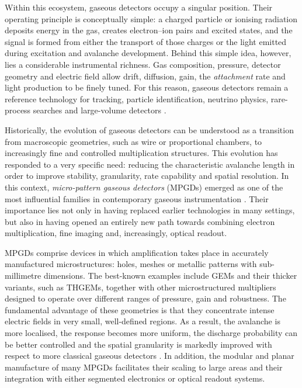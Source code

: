 \documentclass[12pt,a4paper]{article}
\begin{document}
Within this ecosystem, gaseous detectors occupy a singular position. Their operating principle is conceptually simple: a charged particle or ionising radiation deposits energy in the gas, creates electron--ion pairs and excited states, and the signal is formed from either the transport of those charges or the light emitted during excitation and avalanche development. Behind this simple idea, however, lies a considerable instrumental richness. Gas composition, pressure, detector geometry and electric field allow drift, diffusion, gain, the \textit{attachment} rate and light production to be finely tuned. For this reason, gaseous detectors remain a reference technology for tracking, particle identification, neutrino physics, rare-process searches and large-volume detectors \cite{gonzlezdaz2017gaseous,hayrapetyan2024dune,next2014present,esfahani2023project}.

Historically, the evolution of gaseous detectors can be understood as a transition from macroscopic geometries, such as wire or proportional chambers, to increasingly fine and controlled multiplication structures. This evolution has responded to a very specific need: reducing the characteristic avalanche length in order to improve stability, granularity, rate capability and spatial resolution. In this context, \emph{micro-pattern gaseous detectors} (MPGDs) emerged as one of the most influential families in contemporary gaseous instrumentation \cite{shekhtman2002micropattern,buzulutskov2007radiation}. Their importance lies not only in having replaced earlier technologies in many settings, but also in having opened an entirely new path towards combining electron multiplication, fine imaging and, increasingly, optical readout.

MPGDs comprise devices in which amplification takes place in accurately manufactured microstructures: holes, meshes or metallic patterns with sub-millimetre dimensions. The best-known examples include GEMs and their thicker variants, such as THGEMs, together with other microstructured multipliers designed to operate over different ranges of pressure, gain and robustness. The fundamental advantage of these geometries is that they concentrate intense electric fields in very small, well-defined regions. As a result, the avalanche is more localised, the response becomes more uniform, the discharge probability can be better controlled and the spatial granularity is markedly improved with respect to more classical gaseous detectors \cite{shekhtman2002micropattern,buzulutskov2007radiation,azevedo2016thgem}. In addition, the modular and planar manufacture of many MPGDs facilitates their scaling to large areas and their integration with either segmented electronics or optical readout systems.
\end{document}
